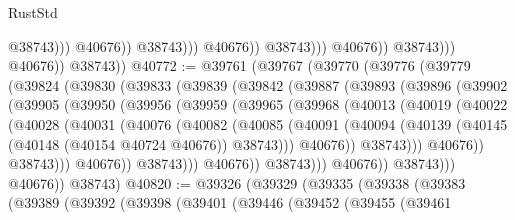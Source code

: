 \begin{lexlean}{RustStd}
\begin{coremodule}
                                                @38743)))
                                          @40676))
                                      @38743)))
                                @40676))
                            @38743)))
                      @40676))
                  @38743)))
            @40676))
        @38743))
@40772 := @39761
    (@39767
      (@39770
        (@39776
          (@39779
            (@39824
              (@39830
                (@39833
                  (@39839
                    (@39842
                      (@39887
                        (@39893
                          (@39896
                            (@39902
                              (@39905
                                (@39950
                                  (@39956
                                    (@39959
                                      (@39965
                                        (@39968
                                          (@40013
                                            (@40019
                                              (@40022
                                                (@40028
                                                  (@40031
                                                    (@40076
                                                      (@40082
                                                        (@40085
                                                          (@40091
                                                            (@40094
                                                              (@40139
                                                                (@40145
                                                                  (@40148 (@40154 @40724 @40676))
                                                                  @38743)))
                                                            @40676))
                                                        @38743)))
                                                  @40676))
                                              @38743)))
                                        @40676))
                                    @38743)))
                              @40676))
                          @38743)))
                    @40676))
                @38743)))
          @40676))
      @38743)
@40820 := @39326
    (@39329
      (@39335
        (@39338
          (@39383
            (@39389
              (@39392
                (@39398
                  (@39401
                    (@39446
                      (@39452
                        (@39455
                          (@39461

\end{coremodule}
\end{lexlean}
